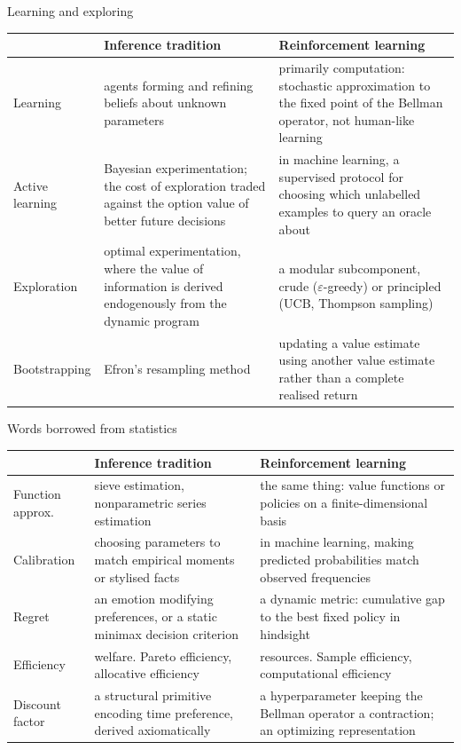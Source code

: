 \begin{frame}[shrink=15]{Learning and exploring}
\small
\begin{tabularx}{\textwidth}{@{}l>{\raggedright\arraybackslash}X>{\raggedright\arraybackslash}X@{}}
\toprule
 & \color{rlblue}Inference tradition & \color{rlorange}Reinforcement learning \\
\midrule
Learning
  & agents forming and refining beliefs about unknown parameters
  & primarily \alert{computation}: stochastic approximation to the fixed point of
    the Bellman operator, not human-like learning \\
Active learning
  & Bayesian experimentation; the cost of exploration traded against the option
    value of better future decisions
  & in machine learning, a supervised protocol for choosing which unlabelled
    examples to query an oracle about \\
Exploration
  & optimal experimentation, where the value of information is derived endogenously
    from the dynamic program
  & a modular subcomponent, crude ($\varepsilon$-greedy) or principled (UCB,
    Thompson sampling) \\
Bootstrapping
  & Efron's resampling method \citep{Efron1979}
  & updating a value estimate using another value estimate rather than a complete
    realised return \citep{sutton1988} \\
\bottomrule
\end{tabularx}
\end{frame}

\begin{frame}[shrink=15]{Words borrowed from statistics}
\small
\begin{tabularx}{\textwidth}{@{}l>{\raggedright\arraybackslash}X>{\raggedright\arraybackslash}X@{}}
\toprule
 & \color{rlblue}Inference tradition & \color{rlorange}Reinforcement learning \\
\midrule
Function approx.
  & sieve estimation, nonparametric series estimation
  & the same thing: value functions or policies on a finite-dimensional basis \\
Calibration
  & choosing parameters to match empirical moments or stylised facts
  & in machine learning, making predicted probabilities match observed
    frequencies \\
Regret
  & an emotion modifying preferences, or a static minimax decision criterion
  & a dynamic metric: cumulative gap to the best fixed policy in hindsight \\
Efficiency
  & welfare. Pareto efficiency, allocative efficiency
  & resources. Sample efficiency, computational efficiency \\
Discount factor
  & a structural primitive encoding time preference, derived axiomatically
    \citep{Koopmans1960}
  & a hyperparameter keeping the Bellman operator a contraction; an optimizing
    representation \citep{Pitis2019} \\
\bottomrule
\end{tabularx}
\end{frame}


